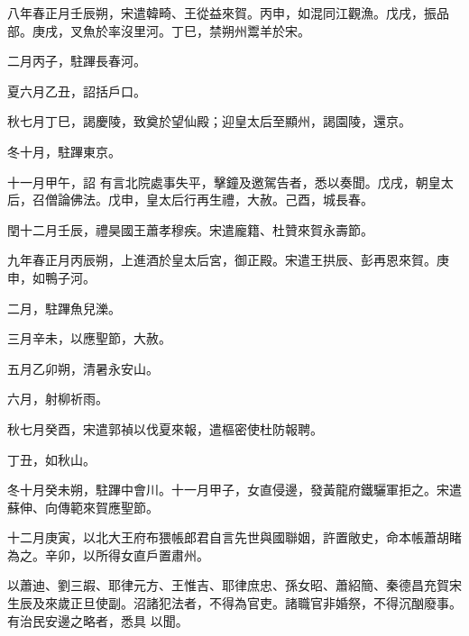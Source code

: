 \begin{pinyinscope}
 八年春正月壬辰朔，宋遣韓畸、王從益來賀。丙申，如混同江觀漁。戊戌，振品部。庚戌，叉魚於率沒里河。丁巳，禁朔州鬻羊於宋。



 二月丙子，駐蹕長春河。



 夏六月乙丑，詔括戶口。



 秋七月丁巳，謁慶陵，致奠於望仙殿；迎皇太后至顯州，謁園陵，還京。



 冬十月，駐蹕東京。



 十一月甲午，詔
 有言北院處事失平，擊鐘及邀駕告者，悉以奏聞。戊戌，朝皇太后，召僧論佛法。戊申，皇太后行再生禮，大赦。己酉，城長春。



 閏十二月壬辰，禮昊國王蕭孝穆疾。宋遣龐籍、杜贊來賀永壽節。



 九年春正月丙辰朔，上進酒於皇太后宮，御正殿。宋遣王拱辰、彭再恩來賀。庚申，如鴨子河。



 二月，駐蹕魚兒濼。



 三月辛未，以應聖節，大赦。



 五月乙卯朔，清暑永安山。



 六月，射柳祈雨。



 秋七月癸酉，宋遣郭禎以伐夏來報，遣樞密使杜防報聘。



 丁丑，如秋山。



 冬十月癸未朔，駐蹕中會川。十一月甲子，女直侵邊，發黃龍府鐵驪軍拒之。宋遣
 蘇伸、向傳範來賀應聖節。



 十二月庚寅，以北大王府布猥帳郎君自言先世與國聯姻，許置敞史，命本帳蕭胡睹為之。辛卯，以所得女直戶置肅州。



 以蕭迪、劉三嘏、耶律元方、王惟吉、耶律庶忠、孫女昭、蕭紹簡、秦德昌充賀宋生辰及來歲正旦使副。沼諸犯法者，不得為官吏。諸職官非婚祭，不得沉酗廢事。有治民安邊之略者，悉具
 以聞。



\end{pinyinscope}